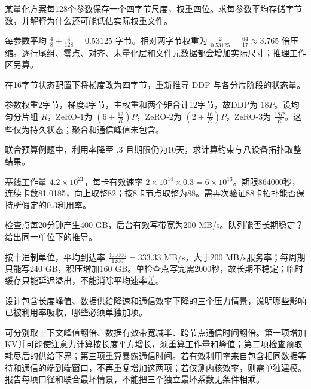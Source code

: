 \begin{exercises}
\begin{exercise} 某量化方案每128个参数保存一个四字节尺度，权重四位。求每参数平均存储字节数，并解释为什么还可能低估实际权重文件。

\begin{solution}
每参数平均 $\frac{4}{8}+\frac{4}{128}=0.53125$ 字节。相对两字节权重为 $\frac{2}{0.53125}=\frac{64}{17}\approx3.765$ 倍压缩。逐行尾组、零点、对齐、未量化层和文件元数据都会增加实际尺寸；推理工作区另算。
\end{solution}
\end{exercise}

\begin{exercise} 在16字节状态配置下将梯度改为四字节，重新推导 DDP 与各分片阶段的状态量。

\begin{solution}
参数权重2字节，梯度4字节，主权重和两个矩合计12字节，故DDP为 $18P$。设均匀分片组 $R$，ZeRO-1为 $(6+\frac{12}{R})P$，ZeRO-2为 $(2+\frac{16}{R})P$，ZeRO-3为 $\frac{18P}{R}$。这些仅为持久状态；聚合和通信峰值未包含。
\end{solution}
\end{exercise}

\begin{exercise} 联合预算例题中，利用率降至 $.3$ 且期限仍为10天，求计算约束与八设备拓扑取整结果。

\begin{solution}
基线工作量 $4.2\times10^{21}$，每卡有效速率 $2\times10^{14}\times0.3=6\times10^{13}$。期限864000秒，连续卡数81.0185，向上取整82；按8卡节点取整为88。需再次验证88卡拓扑能否保持所假定的0.3利用率。
\end{solution}
\end{exercise}

\begin{exercise} 检查点每20分钟产生400 GB，后台有效写带宽为200 MB/s。队列能否长期稳定？给出同一单位下的推导。

\begin{solution}
按十进制单位，平均到达率 $\frac{400000}{1200}=333.33$ MB/s，大于200 MB/s服务率；每周期只能写240 GB，积压增加160 GB。单检查点写完需2000秒，故长期不稳定；临时缓存只能延迟溢出，不能消除平均速率差。
\end{solution}
\end{exercise}

\begin{exercise}\optional 设计包含长度峰值、数据供给降速和通信效率下降的三个压力情景，说明哪些影响已被利用率吸收，哪些必须单独加项。

\begin{solution}
可分别取上下文峰值翻倍、数据有效带宽减半、跨节点通信时间翻倍。第一项增加KV并可能使注意力计算按长度平方增长，须重算工作量和峰值；第二项检查预取耗尽后的供给下界；第三项重算暴露通信时间。若有效利用率来自包含相同数据等待和通信的端到端窗口，不再重复增加这两项；若仅测内核效率，则需单独建模。报告每项口径和联合最坏情景，不能把三个独立最坏系数无条件相乘。
\end{solution}
\end{exercise}

\end{exercises}
